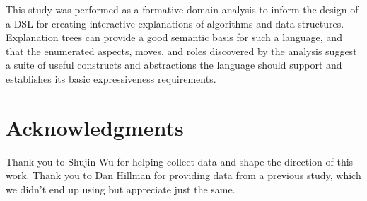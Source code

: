 \documentclass[sigconf]{acmart}
\begin{document}
This study was performed as a formative domain analysis to inform the design of
a DSL for creating interactive explanations of algorithms and data structures.
Explanation trees can provide a good semantic basis for such a language, and
that the enumerated aspects, moves, and roles discovered by the analysis
suggest a suite of useful constructs and abstractions the language should
support and establishes its basic expressiveness requirements.


\section*{Acknowledgments}

Thank you to Shujin Wu for helping collect data and shape the direction of this
work.
%
Thank you to Dan Hillman for providing data from a previous study, which we
didn't end up using but appreciate just the same.




\end{document}
